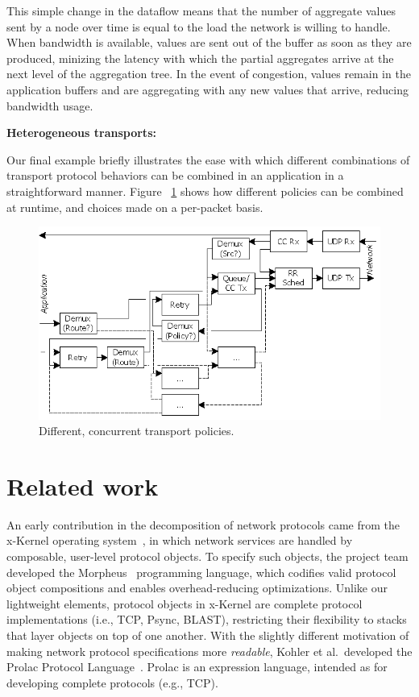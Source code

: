 \documentclass[10pt,twocolumn]{article}
\renewcommand{\subsection}[1]{\vspace{10pt}\noindent\textbf{#1:}\vspace{5pt}}
\begin{document}
This simple change in the dataflow means that the number of aggregate
values sent by a node over time is equal to the load the network
is willing to handle.  When bandwidth is available, values are sent
out of the buffer as soon as they are produced, minizing the latency
with which the partial aggregates arrive at the next level of the
aggregation tree.  In the event of congestion, values remain in the
application buffers and are aggregating with any new values that
arrive, reducing bandwidth usage. 

\subsection{Heterogeneous transports}

Our final example briefly illustrates the ease with which different
combinations of transport protocol behaviors can be combined in an
application in a straightforward manner.  Figure
~\ref{fig:Classification} shows how different policies can be combined
at runtime, and choices made on a per-packet basis. 

\begin{figure}
\centerline{\includegraphics{Classification}}
\caption{Different, concurrent transport policies.}
\label{fig:Classification}
\end{figure}

\section{Related work}
\label{sec:related}

An early contribution in the decomposition of network protocols came
from the x-Kernel operating system~\cite{x-kernel}, in which network
services are handled by composable, user-level protocol objects. To
specify such objects, the project team developed the Morpheus~\cite{Morpheus}
programming language, which codifies valid protocol object compositions
and enables overhead-reducing optimizations.  Unlike our lightweight
elements, protocol objects in x-Kernel are complete protocol
implementations (i.e., TCP, Psync, BLAST), restricting their flexibility
to stacks that layer objects on top of one another.
With the slightly different motivation of making network protocol specifications more
\emph{readable}, Kohler et al.\ developed the Prolac Protocol
Language~\cite{prolac}. Prolac is an expression language, intended as for developing
complete protocols (e.g., TCP).
\end{document}
